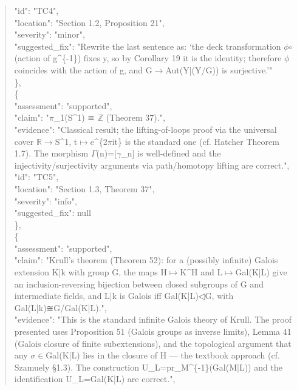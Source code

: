 \documentclass[11pt]{article}
\begin{document}
\begin{quote}
      "id": "TC4",\\
      "location": "Section 1.2, Proposition 21",\\
      "severity": "minor",\\
      "suggested\_fix": "Rewrite the last sentence as: ‘the deck transformation \ensuremath{\phi}\ensuremath{\circ}(action of g\^{}\{-1\}) fixes y, so by Corollary 19 it is the identity; therefore \ensuremath{\phi} coincides with the action of g, and G\ensuremath{\to}Aut(Y|(Y/G)) is surjective.’"\\
    \},\\
    \{\\
      "assessment": "supported",\\
      "claim": "\ensuremath{\pi}\_1(S\^{}1) ≅ \ensuremath{\mathbb{Z}} (Theorem 37).",\\
      "evidence": "Classical result; the lifting-of-loops proof via the universal cover \ensuremath{\mathbb{R}}\ensuremath{\to}S\^{}1, t\ensuremath{\mapsto}e\^{}\{2\ensuremath{\pi}it\} is the standard one (cf. Hatcher Theorem 1.7). The morphism \ensuremath{\Gamma}(n)=[\ensuremath{\gamma}\_n] is well-defined and the injectivity/surjectivity arguments via path/homotopy lifting are correct.",\\
      "id": "TC5",\\
      "location": "Section 1.3, Theorem 37",\\
      "severity": "info",\\
      "suggested\_fix": null\\
    \},\\
    \{\\
      "assessment": "supported",\\
      "claim": "Krull’s theorem (Theorem 52): for a (possibly infinite) Galois extension K|k with group G, the maps H\ensuremath{\mapsto}K\^{}H and L\ensuremath{\mapsto}Gal(K|L) give an inclusion-reversing bijection between closed subgroups of G and intermediate fields, and L|k is Galois iff Gal(K|L)◁G, with Gal(L|k)≅G/Gal(K|L).",\\
      "evidence": "This is the standard infinite Galois theory of Krull. The proof presented uses Proposition 51 (Galois groups as inverse limits), Lemma 41 (Galois closure of finite subextensions), and the topological argument that any \ensuremath{\sigma}\ensuremath{\in}Gal(K|L) lies in the closure of H --- the textbook approach (cf. Szamuely §1.3). The construction U\_L=pr\_M\^{}\{-1\}(Gal(M|L)) and the identification U\_L=Gal(K|L) are correct.",\\

\end{quote}
\end{document}
